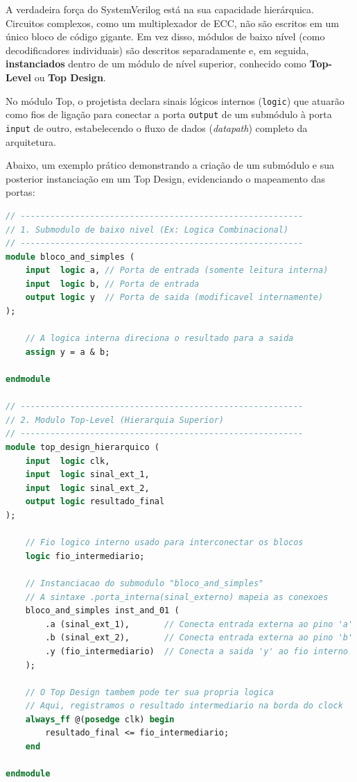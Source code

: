 \documentclass[12pt,a4paper]{article}
\begin{document}
A verdadeira força do SystemVerilog está na sua capacidade hierárquica. Circuitos complexos, como um multiplexador de ECC, não são escritos em um único bloco de código gigante. Em vez disso, módulos de baixo nível (como decodificadores individuais) são descritos separadamente e, em seguida, \textbf{instanciados} dentro de um módulo de nível superior, conhecido como \textbf{Top-Level} ou \textbf{Top Design}.

No módulo Top, o projetista declara sinais lógicos internos (\texttt{logic}) que atuarão como fios de ligação para conectar a porta \texttt{output} de um submódulo à porta \texttt{input} de outro, estabelecendo o fluxo de dados (\textit{datapath}) completo da arquitetura.

Abaixo, um exemplo prático demonstrando a criação de um submódulo e sua posterior instanciação em um Top Design, evidenciando o mapeamento das portas:
\newpage
\begin{lstlisting}[language=SystemVerilog, caption={Exemplo de criacão de submódulo e instanciacão em um Top Design.}]
// ---------------------------------------------------------
// 1. Submodulo de baixo nivel (Ex: Logica Combinacional)
// ---------------------------------------------------------
module bloco_and_simples (
    input  logic a, // Porta de entrada (somente leitura interna)
    input  logic b, // Porta de entrada
    output logic y  // Porta de saida (modificavel internamente)
);

    // A logica interna direciona o resultado para a saida
    assign y = a & b;

endmodule

// ---------------------------------------------------------
// 2. Modulo Top-Level (Hierarquia Superior)
// ---------------------------------------------------------
module top_design_hierarquico (
    input  logic clk,
    input  logic sinal_ext_1,
    input  logic sinal_ext_2,
    output logic resultado_final
);

    // Fio logico interno usado para interconectar os blocos
    logic fio_intermediario;

    // Instanciacao do submodulo "bloco_and_simples"
    // A sintaxe .porta_interna(sinal_externo) mapeia as conexoes
    bloco_and_simples inst_and_01 (
        .a (sinal_ext_1),       // Conecta entrada externa ao pino 'a'
        .b (sinal_ext_2),       // Conecta entrada externa ao pino 'b'
        .y (fio_intermediario)  // Conecta a saida 'y' ao fio interno
    );

    // O Top Design tambem pode ter sua propria logica
    // Aqui, registramos o resultado intermediario na borda do clock
    always_ff @(posedge clk) begin
        resultado_final <= fio_intermediario;
    end

endmodule
\end{lstlisting}
\end{document}
